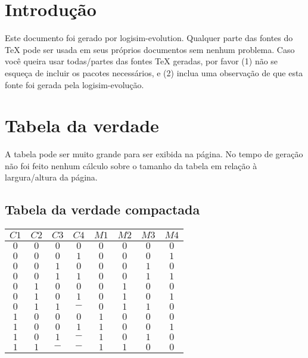 \documentclass [15pt,a4paper,twoside]{article}
\begin{document}
\section{Introdução}
Este documento foi gerado por logisim-evolution. Qualquer parte das fontes do TeX pode ser usada em seus próprios documentos sem nenhum problema. Caso você queira usar todas/partes das fontes TeX geradas, por favor (1) não se esqueça de incluir os pacotes necessários, e (2) inclua uma observação de que esta fonte foi gerada pela logisim-evolução.
\section{Tabela da verdade}
A tabela pode ser muito grande para ser exibida na página. No tempo de geração não foi feito nenhum cálculo sobre o tamanho da tabela em relação à largura/altura da página.
\subsection{Tabela da verdade compactada}
\begin{center}
\begin{tabular}{cccc|cccc}
$C1$&$C2$&$C3$&$C4$&$M1$&$M2$&$M3$&$M4$\\
\hline
$0$&$0$&$0$&$0$&$0$&$0$&$0$&$0$\\
$0$&$0$&$0$&$1$&$0$&$0$&$0$&$1$\\
$0$&$0$&$1$&$0$&$0$&$0$&$1$&$0$\\
$0$&$0$&$1$&$1$&$0$&$0$&$1$&$1$\\
$0$&$1$&$0$&$0$&$0$&$1$&$0$&$0$\\
$0$&$1$&$0$&$1$&$0$&$1$&$0$&$1$\\
$0$&$1$&$1$&$-$&$0$&$1$&$1$&$0$\\
$1$&$0$&$0$&$0$&$1$&$0$&$0$&$0$\\
$1$&$0$&$0$&$1$&$1$&$0$&$0$&$1$\\
$1$&$0$&$1$&$-$&$1$&$0$&$1$&$0$\\
$1$&$1$&$-$&$-$&$1$&$1$&$0$&$0$\\

\end{tabular}
\end{center}
\end{document}
